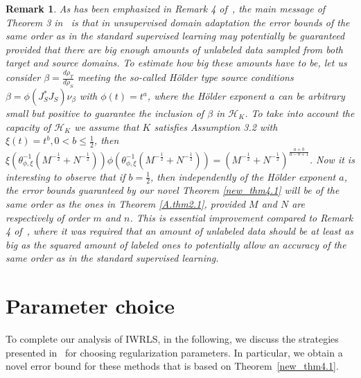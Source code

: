 \documentclass[USenglish]{article}
\newcommand{\hk}{{\mathcal{H}_K}}
\newtheorem{remark}{Remark}
\begin{document}
\begin{remark}\label{rem4.1}
    As has been emphasized in Remark 4 of~\cite{gizewski2022regularization}, the main message of Theorem 3 in~\cite{gizewski2022regularization} is that in unsupervised domain adaptation the error bounds of the same order as in the standard supervised learning may potentially be guaranteed provided that there are big enough amounts of unlabeled data sampled from both target and source domains. To estimate how big these amounts have to be, let us consider $\beta = \frac{d \rho_T}{d\rho_S}$ meeting the so-called Hölder type source conditions $\beta = \phi (J_S^*J_S) \nu_\beta$ with $\phi (t) = t^a$, where the Hölder exponent $a$ can be arbitrary small but positive to guarantee the inclusion of $\beta$ in $\hk$. 
    To take into account the capacity of $\hk$
    we assume that $K$ satisfies Assumption 3.2 with $\xi (t) = t^b, 0<b \leq \frac{1}{2}$, then $\xi (\theta_{\phi,\xi}^{-1} (M^{-\frac{1}{2}}  + N^{-\frac{1}{2}}) ) \phi (\theta_{\phi,\xi}^{-1} (M^{-\frac{1}{2}}  + N^{-\frac{1}{2}} ) ) = (M^{-\frac{1}{2}}  + N^{-\frac{1}{2}} )^{\frac{a+b}{a-b+1}} $. Now it is interesting to observe that if  $b=\frac{1}{2}$, then independently of the Hölder exponent $a$, the error bounds guaranteed by our novel Theorem \ref{new_thm4.1} will be of the same order as the ones in Theorem \ref{A.thm2.1}, provided $M$ and $N$ are respectively of order $m$ and $n$. This is essential improvement compared to Remark 4 of~\cite{gizewski2022regularization}, where it was required that an amount of unlabeled data should be at least as big as the squared amount of labeled ones to potentially allow an accuracy of the same order as in the standard supervised learning.
\end{remark}

\section{Parameter choice}
\label{sec:parameter_choice}

To complete our analysis of IWRLS, in the following, we discuss the strategies presented in~\cite{gizewski2022regularization,dinu2022aggregation} for choosing regularization parameters.
In particular, we obtain a novel error bound for these methods that is based on Theorem~\ref{new_thm4.1}.
\end{document}

